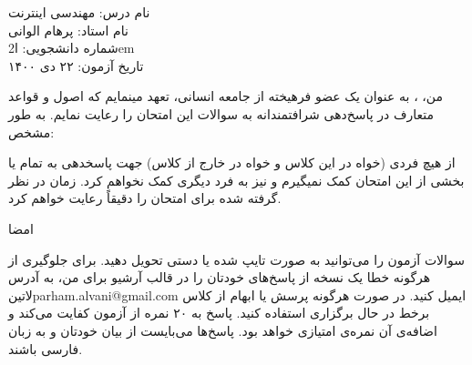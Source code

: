 \documentclass[../main.tex]{subfiles}
\begin{document}
نام درس:‌ مهندسی اینترنت\\
نام استاد:‌ پرهام الوانی\\
شماره دانشجویی:‌ ‌ا{2em}\\
تاریخ آزمون: ۲۲ دی ۱۴۰۰

من، ، به عنوان یک عضو فرهیخته از جامعه انسانی،
تعهد مینمایم که اصول و قواعد متعارف در پاسخ‌دهی
شرافتمندانه به سوالات این امتحان را رعایت نمایم. به طور مشخص:

     از هیچ فردی (خواه در این کلاس و خواه در خارج از کلاس) جهت پاسخدهی به تمام یا بخشی از
    این امتحان کمک نمیگیرم و نیز به فرد دیگری کمک نخواهم کرد.
     زمان در نظر گرفته شده برای امتحان را دقیقاً رعایت خواهم کرد.

امضا

     سوالات آزمون را می‌توانید به صورت تایپ شده یا دستی تحویل دهید.
     برای جلوگیری از هرگونه خطا یک نسخه از پاسخ‌های خودتان را در قالب آرشیو برای من، به آدرس ‌لاتین{parham.alvani@gmail.com} ایمیل کنید.
     در صورت هرگونه پرسش یا ابهام از کلاس برخط در حال برگزاری استفاده کنید.
     پاسخ به ۲۰ نمره از آزمون کفایت می‌کند و اضافه‌ی آن نمره‌ی امتیازی خواهد بود.
     پاسخ‌ها می‌بایست از بیان خودتان و به زبان فارسی باشند.
\end{document}

